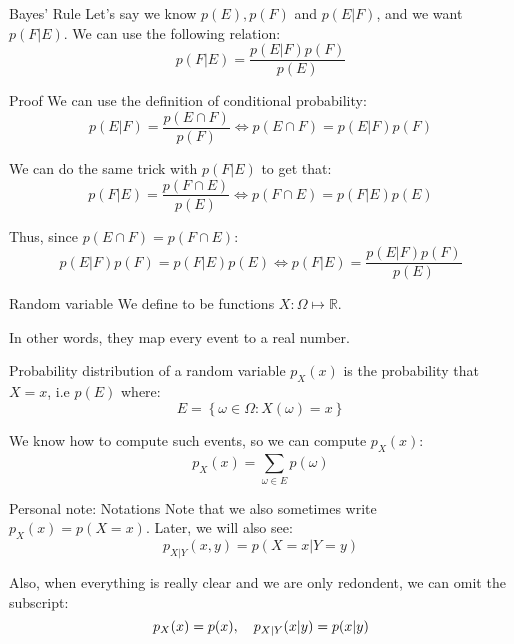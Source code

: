 \documentclass[a4paper]{article}
\begin{document}
\begin{parag}{Bayes' Rule}
    Let's say we know $p\left(E\right), p\left(F\right)$ and $p\left(E | F\right)$, and we want $p\left(F | E\right)$. We can use the following relation:
    \[p\left(F | E\right) = \frac{p\left(E |F\right)p\left(F\right)}{p\left(E\right)}\]

    \begin{subparag}{Proof}
        We can use the definition of conditional probability:
        \[p\left(E |F\right) = \frac{p\left(E \cap F\right)}{p\left(F\right)} \iff p\left(E \cap F\right) = p\left(E | F\right)p\left(F\right)\]

        We can do the same trick with $p\left(F | E\right)$ to get that:
        \[p\left(F |E\right) = \frac{p\left(F \cap E\right)}{p\left(E\right) } \iff p\left(F \cap E\right) = p\left(F | E\right)p\left(E\right)\]

        Thus, since $p\left(E \cap F\right) = p\left(F \cap E\right)$:
        \[p\left(E |F\right) p\left(F\right) = p\left(F | E\right) p\left(E\right) \iff p\left(F | E\right) = \frac{p\left(E |F\right)p\left(F\right)}{p\left(E\right)}\]

    \end{subparag}

\end{parag}

\begin{parag}{Random variable}
    We define  to be functions $X : \Omega \mapsto \mathbb{R}$.

    In other words, they map every event to a real number.
\end{parag}

\begin{parag}{Probability distribution of a random variable}
    $p_X\left(x\right)$ is the probability that $X = x$, i.e $p\left(E\right)$ where:
    \[E = \left\{\omega \in \Omega : X\left(\omega\right) = x\right\}\]

    We know how to compute such events, so we can compute $p_X\left(x\right)$:
    \[p_X\left(x\right) = \sum_{\omega \in E}^{} p\left(\omega\right)\]

    \begin{subparag}{Personal note: Notations}
        Note that we also sometimes write $p_X\left(x\right) = p\left(X = x\right)$. Later, we will also see:
        \[p_{X|Y}\left(x, y\right) = p\left(X = x | Y = y\right)\]

        Also, when everything is really clear and we are only redondent, we can omit the subscript:
        \[p_{X}\left(x\right) = p\left(x\right), \mathspace p_{X|Y}\left(x| y\right) = p\left(x|y\right)\]
    \end{subparag}

\end{parag}
\end{document}
